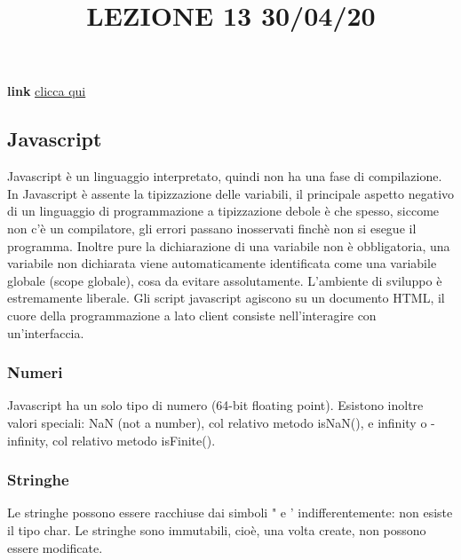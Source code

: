 \title{LEZIONE 13 30/04/20}
\textbf{link} \href{https://web.microsoftstream.com/video/9d3a5028-1a7e-471e-95cd-1bcf6ae58d8a?list=user&userId=cfe0965d-9a7c-40e2-be6e-f078296a1914}{clicca qui}
\subsection{Javascript}
Javascript è un linguaggio interpretato, quindi non ha una fase di compilazione.\newline
\newline
In Javascript è assente la tipizzazione delle variabili, il principale aspetto negativo di un linguaggio di programmazione a tipizzazione debole è che spesso, siccome non c'è un compilatore, gli errori passano inosservati finchè non si esegue il programma.\newline
Inoltre pure la dichiarazione di una variabile non è obbligatoria, una variabile non dichiarata viene automaticamente identificata come una variabile globale (scope globale), cosa da evitare assolutamente.\newline
L'ambiente di sviluppo è estremamente liberale.\newline
\newline
Gli script javascript agiscono su un documento HTML, il cuore della programmazione a lato client consiste nell'interagire con un'interfaccia.
\subsubsection{Numeri}
Javascript ha un solo tipo di numero (64-bit floating point).\newline
\newline
Esistono inoltre valori speciali: NaN (not a number), col relativo metodo isNaN(), e infinity o -infinity, col relativo metodo isFinite().
\subsubsection{Stringhe}
Le stringhe possono essere racchiuse dai simboli " e ' indifferentemente: non esiste il tipo char.\newline
\newline
Le stringhe sono immutabili, cioè, una volta create, non possono essere modificate.
